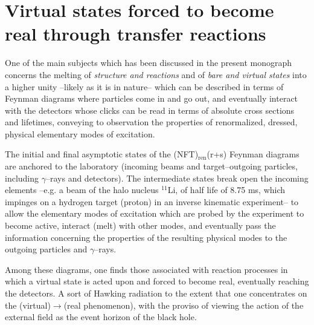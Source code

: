 %
%
%
%
%
\section{Virtual states forced to become real through transfer reactions}\label{C6S4}
One of the main subjects which has been discussed in the present monograph concerns the melting of \textit{structure and reactions} and of \textit{bare and virtual states} into a higher unity --likely as it is in nature-- which can be described in terms of Feynman diagrams where particles come in and go out, and eventually interact with the detectors whose clicks can be read in terms of absolute cross sections and lifetimes, conveying to observation the properties of renormalized, dressed, physical elementary modes of excitation.


The initial and final asymptotic states of the (NFT)$_{\text{ren}}$(r+s) Feynman diagrams are anchored to the laboratory (incoming beams and target--outgoing particles, including $\gamma$--rays and detectors). The intermediate states break open the incoming elements --e.g. a beam of the halo nucleus $^{11}$Li, of half life of 8.75 ms, which impinges on a hydrogen target (proton) in an inverse kinematic experiment-- to allow the elementary modes of excitation which are probed by the experiment to become active, interact (melt) with other modes, and eventually pass the information concerning the properties of the resulting physical modes to the outgoing particles and $\gamma$--rays.


Among these diagrams, one finds those associated with reaction processes in which a virtual state is acted upon and forced to become real, eventually reaching the detectors. A sort of Hawking radiation to the extent that one concentrates on the (virtual)$\to$(real phenomenon), with the proviso of viewing the action of the external field as the event horizon of the black hole.


